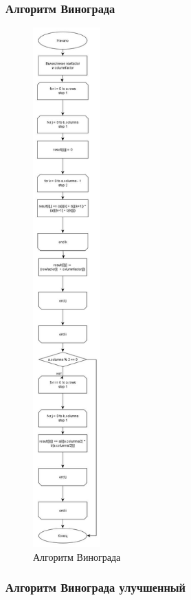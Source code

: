 \documentclass[a4paper, 14pt]{article}
\begin{document}
	\subsubsection{Алгоритм Винограда}
	
	\vspace{1cm}
	
	\begin{figure}[]
		\centering
		\includegraphics[height=20cm]{Схемы/vinograd}
		\caption{Алгоритм Винограда}
		\label{fig:vinograd}
	\end{figure}
	
	
	\subsubsection{Алгоритм Винограда улучшенный}
	
\end{document}

